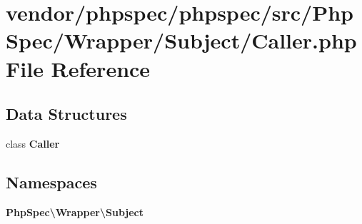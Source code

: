 \section{vendor/phpspec/phpspec/src/\+Php\+Spec/\+Wrapper/\+Subject/\+Caller.php File Reference}
\label{_caller_8php}
\subsection*{Data Structures}
\begin{DoxyCompactItemize}
\item 
class {\bf Caller}
\end{DoxyCompactItemize}
\subsection*{Namespaces}
\begin{DoxyCompactItemize}
\item 
 {\bf Php\+Spec\textbackslash{}\+Wrapper\textbackslash{}\+Subject}
\end{DoxyCompactItemize}
